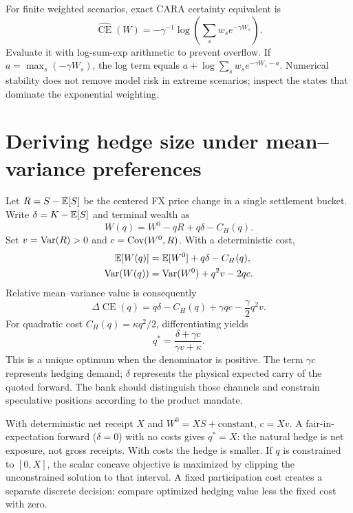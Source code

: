 For finite weighted scenarios, exact CARA certainty equivalent is
\begin{equation}
\widehat{\operatorname{CE}}(W)
=-\gamma^{-1}\log\left(\sum_s w_s e^{-\gamma W_s}\right).
\end{equation}
Evaluate it with log-sum-exp arithmetic to prevent overflow. If $a=\max_s(-\gamma W_s)$, the log term equals $a+\log\sum_sw_se^{-\gamma W_s-a}$. Numerical stability does not remove model risk in extreme scenarios; inspect the states that dominate the exponential weighting.

\section{Deriving hedge size under mean--variance preferences}
Let $R=S-\mathbb E[S]$ be the centered FX price change in a single settlement bucket. Write $\delta=K-\mathbb E[S]$ and terminal wealth as
\begin{equation}
W(q)=W^0-qR+q\delta-C_H(q).
\end{equation}
Set $v=\operatorname{Var}(R)>0$ and $c=\operatorname{Cov}(W^0,R)$. With a deterministic cost,
\begin{align}
\mathbb E[W(q)]&=\mathbb E[W^0]+q\delta-C_H(q),\\
\operatorname{Var}(W(q))&=\operatorname{Var}(W^0)+q^2v-2qc.
\end{align}
Relative mean--variance value is consequently
\begin{equation}
\Delta\operatorname{CE}(q)
=q\delta-C_H(q)+\gamma qc-\frac\gamma2q^2v.
\label{eq:hedgegain}
\end{equation}
For quadratic cost $C_H(q)=\kappa q^2/2$, differentiating yields
\begin{equation}
q^*=\frac{\delta+\gamma c}{\gamma v+\kappa}.
\label{eq:hedgeopt}
\end{equation}
This is a unique optimum when the denominator is positive. The term $\gamma c$ represents hedging demand; $\delta$ represents the physical expected carry of the quoted forward. The bank should distinguish those channels and constrain speculative positions according to the product mandate.

With deterministic net receipt $X$ and $W^0=XS+\text{constant}$, $c=Xv$. A fair-in-expectation forward ($\delta=0$) with no costs gives $q^*=X$: the natural hedge is net exposure, not gross receipts. With costs the hedge is smaller. If $q$ is constrained to $[0,X]$, the scalar concave objective is maximized by clipping the unconstrained solution to that interval. A fixed participation cost creates a separate discrete decision: compare optimized hedging value less the fixed cost with zero.


